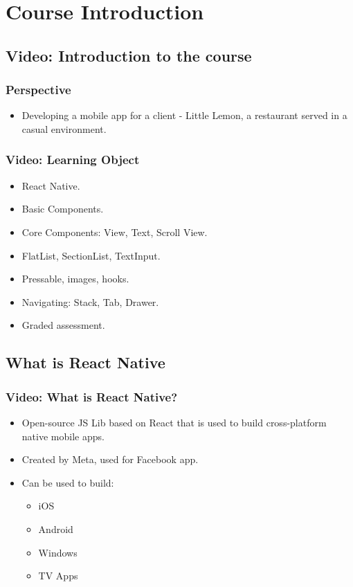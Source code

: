 \chapter{Course Introduction}

\section{Video: Introduction to the course}
\subsection{Perspective}
\begin{itemize}
    \item Developing a mobile app for a client - Little Lemon, a restaurant served in a casual environment.
\end{itemize}

\subsection{Video: Learning Object}
\begin{itemize}
    \item React Native.
    \item Basic Components.
    \item Core Components: View, Text, Scroll View.
    \item FlatList, SectionList, TextInput.
    \item Pressable, images, hooks.
    \item Navigating: Stack, Tab, Drawer.
    \item Graded assessment.
\end{itemize}

\section{What is React Native}

\subsection{Video: What is React Native?}
\begin{itemize}
    \item Open-source JS Lib based on React that is used to build cross-platform native mobile apps.
    \item Created by Meta, used for Facebook app.
    \item Can be used to build:
    \begin{itemize}[label=$\circ$]
        \item iOS
        \item Android
        \item Windows
        \item TV Apps
    \end{itemize}
\end{itemize}

